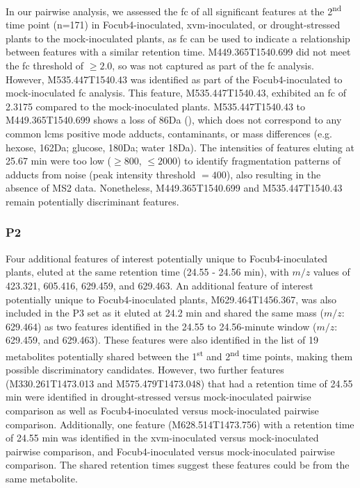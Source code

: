 In our pairwise analysis, we assessed the \acf{fc} of all significant features at the 2\textsuperscript{nd} time point (n=171) in \ac{Focub4}-inoculated, \ac{xvm}-inoculated, or drought-stressed plants to the mock-inoculated plants, as \ac{fc} can be used to indicate a relationship between features with a similar retention time. M449.365T1540.699 did not meet the \ac{fc} threshold of $\ge2.0$, so was not captured as part of the \ac{fc} analysis. However, M535.447T1540.43 was identified as part of the \ac{Focub4}-inoculated to mock-inoculated \ac{fc} analysis. This feature, M535.447T1540.43, exhibited an \ac{fc} of 2.3175 compared to the mock-inoculated plants. M535.447T1540.43 to M449.365T1540.699 shows a loss of 86Da (), which does not correspond to any common \ac{lcms} positive mode adducts, contaminants, or mass differences (e.g. hexose, 162Da; glucose, 180Da; water 18Da). The intensities of features eluting at 25.67 min were too low ($\geq800$, $\leq2000$) to identify fragmentation patterns of adducts from noise (peak intensity threshold $=400$), also resulting in the absence of MS2 data. Nonetheless, M449.365T1540.699 and M535.447T1540.43 remain potentially discriminant features.

\subsubsection{P2}

Four additional features of interest potentially unique to \ac{Focub4}-inoculated plants, eluted at the same retention time (24.55 - 24.56 min), with $m/z$ values of 423.321, 605.416, 629.459, and 629.463. An additional feature of interest potentially unique to \ac{Focub4}-inoculated plants, M629.464T1456.367, was also included in the P3 set as it eluted at 24.2 min and shared the same mass ($m/z$: 629.464) as two features identified in the 24.55 to 24.56-minute window ($m/z$: 629.459, and 629.463). These features were also identified in the list of 19 metabolites potentially shared between the 1\textsuperscript{st} and 2\textsuperscript{nd} time points, making them possible discriminatory candidates. However, two further features (M330.261T1473.013 and M575.479T1473.048) that had a retention time of 24.55 min were identified in drought-stressed versus mock-inoculated pairwise comparison as well as \ac{Focub4}-inoculated versus mock-inoculated pairwise comparison. Additionally, one feature (M628.514T1473.756) with a retention time of 24.55 min was identified in the \ac{xvm}-inoculated versus mock-inoculated pairwise comparison, and \ac{Focub4}-inoculated versus mock-inoculated pairwise comparison. The shared retention times suggest these features could be from the same metabolite.

